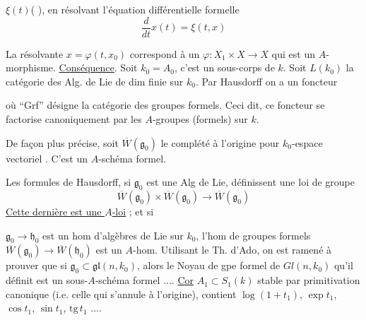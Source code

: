 $\xi(t)$\quad (
), en résolvant l'équation différentielle formelle
\[
 \frac{d}{dt}x(t)=\xi(t,x)
\]

La résolvante $x=\varphi(t,x_0)$ correspond à un $\varphi:X_1\times X\longrightarrow X$ qui est un $A$-morphisme.
\uline{Conséquence}. Soit $k_0=A_0$, c'est un sous-corps de $k$. Soit $L(k_0)$ la catégorie des Alg. de Lie de dim finie sur $k_0$. Par Hausdorff on a un foncteur


où ``Grf'' désigne la catégorie des groupes formels. Ceci dit, ce foncteur se factorise canoniquement par les $A$-groupes (formels) sur $k$.

De façon plus précise, soit $\overline W(\mathfrak g_0)$ le complété à l'origine  pour  $k_0$-espace vectoriel  . C'est un $A$-schéma formel.

Les formules de Hausdorff, si $\mathfrak g_0$ est une Alg de Lie, définissent une loi de groupe
\[
 \overline W(\mathfrak g_0)\times\overline W(\mathfrak g_0)\longrightarrow\overline W(\mathfrak g_0)
\]
\uline{Cette dernière est une $A$-loi} ;  et si

$\mathfrak g_0\longrightarrow\mathfrak h_0$ est un hom d'algèbres de Lie sur $k_0$, l'hom de groupes formels $\overline W(\mathfrak g_0)\longrightarrow\overline W(\mathfrak h_0)$ est un $A$-hom. Utilisant le Th. d'Ado, on est ramené à prouver que si $\mathfrak g_0\subset\mathfrak{gl}(n,k_0)$, alors le Noyau de gpe formel de $Gl(n,k_0)$ qu'il définit est un sous-$A$-schéma formel ....
\uline{Cor} $A_1\subset S_1(k)$ stable par primitivation canonique (i.e. celle qui s'annule à l'origine), contient $\log(1+t_1)$, $\exp t_1$, $\cos t_1$, $\sin t_1$, $\mathrm{tg}\,t_1$ ....

